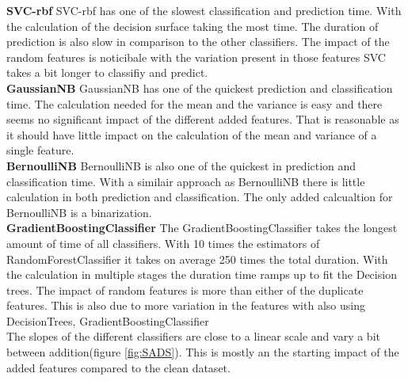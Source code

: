 \documentclass[a4paper,10pt]{article}
\begin{document}
\textbf{SVC-rbf} SVC-rbf has one of the slowest classification and prediction time. With the calculation of the decision surface taking the most time. The duration of prediction is also slow in comparison to the other classifiers. The impact of the random features is noticibale with the variation present in those features SVC takes a bit longer to  classifiy and predict. \\

\textbf{GaussianNB} GaussianNB has one of the quickest prediction and classification time. The calculation needed for the mean and the variance is easy and there seems no significant impact of the different added features. That is reasonable as it should have little impact on the calculation of the mean and variance of a single feature.\\

\textbf{BernoulliNB} BernoulliNB is also one of the quickest in prediction and classification time. With a similair approach as BernoulliNB there is little calculation in both prediction and classification. The only added calcualtion for BernoulliNB is a binarization. \\

\textbf{GradientBoostingClassifier} The GradientBoostingClassifier takes the longest amount of time of all classifiers. With 10 times the estimators of RandomForestClassifier it takes on average 250 times the total duration. With the calculation in multiple stages the duration time ramps up to fit the Decision trees. The impact of random features is more than either of the duplicate features. This is also due to more variation in the features with also using DecisionTrees, GradientBoostingClassifier %
  \\

The slopes of the different classifiers are close to a linear scale and vary a bit between addition(figure \ref{fig:SADS}). This is mostly an the starting impact of the added features compared to the clean dataset. 
\end{document}
